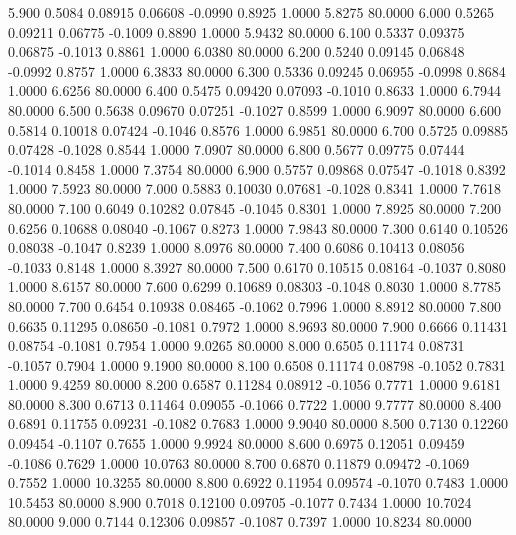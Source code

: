    5.900   0.5084   0.08915   0.06608  -0.0990   0.8925   1.0000   5.8275  80.0000
   6.000   0.5265   0.09211   0.06775  -0.1009   0.8890   1.0000   5.9432  80.0000
   6.100   0.5337   0.09375   0.06875  -0.1013   0.8861   1.0000   6.0380  80.0000
   6.200   0.5240   0.09145   0.06848  -0.0992   0.8757   1.0000   6.3833  80.0000
   6.300   0.5336   0.09245   0.06955  -0.0998   0.8684   1.0000   6.6256  80.0000
   6.400   0.5475   0.09420   0.07093  -0.1010   0.8633   1.0000   6.7944  80.0000
   6.500   0.5638   0.09670   0.07251  -0.1027   0.8599   1.0000   6.9097  80.0000
   6.600   0.5814   0.10018   0.07424  -0.1046   0.8576   1.0000   6.9851  80.0000
   6.700   0.5725   0.09885   0.07428  -0.1028   0.8544   1.0000   7.0907  80.0000
   6.800   0.5677   0.09775   0.07444  -0.1014   0.8458   1.0000   7.3754  80.0000
   6.900   0.5757   0.09868   0.07547  -0.1018   0.8392   1.0000   7.5923  80.0000
   7.000   0.5883   0.10030   0.07681  -0.1028   0.8341   1.0000   7.7618  80.0000
   7.100   0.6049   0.10282   0.07845  -0.1045   0.8301   1.0000   7.8925  80.0000
   7.200   0.6256   0.10688   0.08040  -0.1067   0.8273   1.0000   7.9843  80.0000
   7.300   0.6140   0.10526   0.08038  -0.1047   0.8239   1.0000   8.0976  80.0000
   7.400   0.6086   0.10413   0.08056  -0.1033   0.8148   1.0000   8.3927  80.0000
   7.500   0.6170   0.10515   0.08164  -0.1037   0.8080   1.0000   8.6157  80.0000
   7.600   0.6299   0.10689   0.08303  -0.1048   0.8030   1.0000   8.7785  80.0000
   7.700   0.6454   0.10938   0.08465  -0.1062   0.7996   1.0000   8.8912  80.0000
   7.800   0.6635   0.11295   0.08650  -0.1081   0.7972   1.0000   8.9693  80.0000
   7.900   0.6666   0.11431   0.08754  -0.1081   0.7954   1.0000   9.0265  80.0000
   8.000   0.6505   0.11174   0.08731  -0.1057   0.7904   1.0000   9.1900  80.0000
   8.100   0.6508   0.11174   0.08798  -0.1052   0.7831   1.0000   9.4259  80.0000
   8.200   0.6587   0.11284   0.08912  -0.1056   0.7771   1.0000   9.6181  80.0000
   8.300   0.6713   0.11464   0.09055  -0.1066   0.7722   1.0000   9.7777  80.0000
   8.400   0.6891   0.11755   0.09231  -0.1082   0.7683   1.0000   9.9040  80.0000
   8.500   0.7130   0.12260   0.09454  -0.1107   0.7655   1.0000   9.9924  80.0000
   8.600   0.6975   0.12051   0.09459  -0.1086   0.7629   1.0000  10.0763  80.0000
   8.700   0.6870   0.11879   0.09472  -0.1069   0.7552   1.0000  10.3255  80.0000
   8.800   0.6922   0.11954   0.09574  -0.1070   0.7483   1.0000  10.5453  80.0000
   8.900   0.7018   0.12100   0.09705  -0.1077   0.7434   1.0000  10.7024  80.0000
   9.000   0.7144   0.12306   0.09857  -0.1087   0.7397   1.0000  10.8234  80.0000
